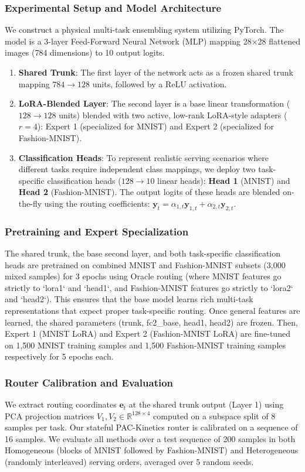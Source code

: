 \subsubsection{Experimental Setup and Model Architecture}
We construct a physical multi-task ensembling system utilizing PyTorch. The model is a 3-layer Feed-Forward Neural Network (MLP) mapping 28$\times$28 flattened images (784 dimensions) to 10 output logits.
\begin{enumerate}
    \item \textbf{Shared Trunk}: The first layer of the network acts as a frozen shared trunk mapping $784 \to 128$ units, followed by a ReLU activation.
    \item \textbf{LoRA-Blended Layer}: The second layer is a base linear transformation ($128 \to 128$ units) blended with two active, low-rank LoRA-style adapters ($r=4$): Expert 1 (specialized for MNIST) and Expert 2 (specialized for Fashion-MNIST).
    \item \textbf{Classification Heads}: To represent realistic serving scenarios where different tasks require independent class mappings, we deploy two task-specific classification heads ($128 \to 10$ linear heads): \textbf{Head 1} (MNIST) and \textbf{Head 2} (Fashion-MNIST). The output logits of these heads are blended on-the-fly using the routing coefficients: $\mathbf{y}_t = \alpha_{1, t} \mathbf{y}_{1, t} + \alpha_{2, t} \mathbf{y}_{2, t}$.
\end{enumerate}

\subsubsection{Pretraining and Expert Specialization}
The shared trunk, the base second layer, and both task-specific classification heads are pretrained on combined MNIST and Fashion-MNIST subsets (3,000 mixed samples) for 3 epochs using Oracle routing (where MNIST features go strictly to `lora1` and `head1`, and Fashion-MNIST features go strictly to `lora2` and `head2`). This ensures that the base model learns rich multi-task representations that expect proper task-specific routing. Once general features are learned, the shared parameters (trunk, fc2\_base, head1, head2) are frozen. Then, Expert 1 (MNIST LoRA) and Expert 2 (Fashion-MNIST LoRA) are fine-tuned on 1,500 MNIST training samples and 1,500 Fashion-MNIST training samples respectively for 5 epochs each.

\subsubsection{Router Calibration and Evaluation}
We extract routing coordinates $\mathbf{e}_t$ at the shared trunk output (Layer 1) using PCA projection matrices $V_1, V_2 \in \mathbb{R}^{128 \times 4}$ computed on a subspace split of 8 samples per task. Our stateful \textsf{PAC-Kinetics} router is calibrated on a sequence of 16 samples. We evaluate all methods over a test sequence of 200 samples in both Homogeneous (blocks of MNIST followed by Fashion-MNIST) and Heterogeneous (randomly interleaved) serving orders, averaged over 5 random seeds.

